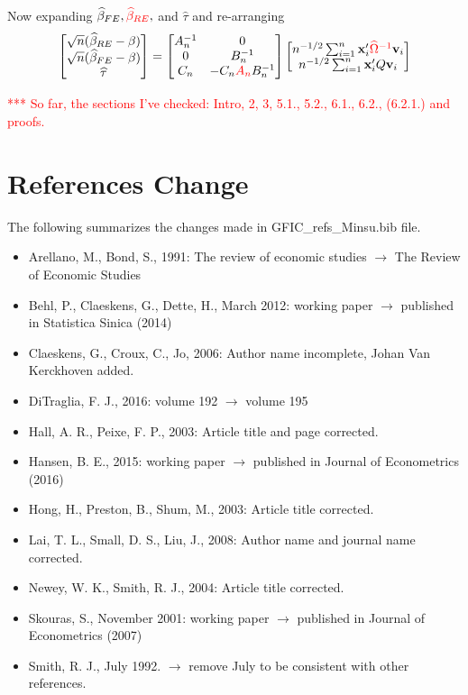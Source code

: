 \documentclass[12pt]{article}
\begin{document}
\begin{itemize}
Now expanding $\widehat{\beta}_{FE}, \textcolor{red}{\widehat{\beta}_{RE}},$ and $\widehat{\tau}$ and re-arranging
\[\begin{bmatrix}
\sqrt{n}(\widehat{\beta}_{RE} - \beta)\\
\sqrt{n}(\widehat{\beta}_{FE}-\beta)\\
\widehat{\tau}
\end{bmatrix} =\begin{bmatrix}
A_n^{-1} & 0\\
0 & B_n^{-1} \\
C_n & -C_n \textcolor{red}{A_n}B_n^{-1}
\end{bmatrix}\begin{bmatrix}
n^{-1/2}\sum_{i=1}^n \mathbf{x}_i' \textcolor{red}{\widehat{\Omega}^{-1}} \mathbf{v}_i\\
n^{-1/2}\sum_{i=1}^n \mathbf{x}_i'Q \mathbf{v}_i
\end{bmatrix} 
\]
\end{itemize}

\newpage
\textcolor{red}{*** So far, the sections I've checked: Intro, 2, 3, 5.1., 5.2., 6.1., 6.2., (6.2.1.) and proofs.}

\section*{References Change}

The following summarizes the changes made in GFIC\_refs\_Minsu.bib file.

\begin{itemize}
\item Arellano, M., Bond, S., 1991: The review of economic studies $\rightarrow$ The Review of Economic Studies
\item Behl, P., Claeskens, G., Dette, H., March 2012: working paper $\rightarrow$ published in Statistica Sinica (2014)
\item Claeskens, G., Croux, C., Jo, 2006: Author name incomplete,  Johan Van Kerckhoven added.
\item DiTraglia, F. J., 2016: volume 192 $\rightarrow$ volume 195
\item Hall, A. R., Peixe, F. P., 2003: Article title and page corrected.
\item Hansen, B. E., 2015: working paper $\rightarrow$ published in Journal of Econometrics (2016)
\item Hong, H., Preston, B., Shum, M., 2003: Article title corrected.
\item Lai, T. L., Small, D. S., Liu, J., 2008: Author name and journal name corrected.
\item Newey, W. K., Smith, R. J., 2004: Article title corrected.
\item Skouras, S., November 2001: working paper $\rightarrow$ published in Journal of Econometrics (2007)
\item Smith, R. J., July 1992. $\rightarrow$ remove July to be consistent with other references.
\end{itemize}
\end{document}
